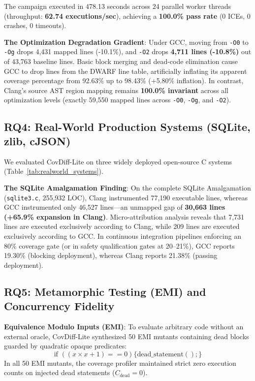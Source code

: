 \documentclass[sigconf,review,anonymous=false]{acmart}
\theoremstyle{definition}
\begin{document}


The campaign executed in 478.13 seconds across 24 parallel worker threads (throughput: \textbf{62.74 executions/sec}), achieving a \textbf{100.0\% pass rate} (0 ICEs, 0 crashes, 0 timeouts).

\textbf{The Optimization Degradation Gradient}:
Under GCC, moving from \texttt{-O0} to \texttt{-Og} drops 4,431 mapped lines (-10.1\%), and \texttt{-O2} drops \textbf{4,711 lines (-10.8\%)} out of 43,763 baseline lines. Basic block merging and dead-code elimination cause GCC to drop lines from the DWARF line table, artificially inflating its apparent coverage percentage from 92.63\% up to 98.43\% (+5.80\% inflation).
In contrast, Clang's source AST region mapping remains \textbf{100.0\% invariant} across all optimization levels (exactly 59,550 mapped lines across \texttt{-O0}, \texttt{-Og}, and \texttt{-O2}).

\subsection{RQ4: Real-World Production Systems (SQLite, zlib, cJSON)}
We evaluated CovDiff-Lite on three widely deployed open-source C systems (Table~\ref{tab:realworld_systems}).



\textbf{The SQLite Amalgamation Finding}:
On the complete SQLite Amalgamation (\texttt{sqlite3.c}, 255,932 LOC), Clang instrumented 77,190 executable lines, whereas GCC instrumented only 46,527 lines—an unmapped gap of \textbf{30,663 lines (+65.9\% expansion in Clang)}. Micro-attribution analysis reveals that 7,731 lines are executed exclusively according to Clang, while 209 lines are executed exclusively according to GCC.
In continuous integration pipelines enforcing an 80\% coverage gate (or in safety qualification gates at 20--21\%), GCC reports 19.30\% (blocking deployment), whereas Clang reports 21.38\% (passing deployment).

\subsection{RQ5: Metamorphic Testing (EMI) and Concurrency Fidelity}
\textbf{Equivalence Modulo Inputs (EMI)}: To evaluate arbitrary code without an external oracle, CovDiff-Lite synthesized 50 EMI mutants containing dead blocks guarded by quadratic opaque predicates:
\begin{equation}
\text{if } ((x \times x + 1) == 0) \{ \text{dead\_statement}(); \}
\end{equation}
In all 50 EMI mutants, the coverage profiler maintained strict zero execution counts on injected dead statements ($C_{\text{dead}} = 0$).
\end{document}

